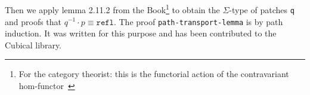 \begin{code}
\AgdaSymbol{)}\AgdaSpace{}%
\AgdaSpace{}%
\AgdaSymbol{))}\<%
\\
\>[2][@{}l@{\AgdaIndent{0}}]%
\>[4]\AgdaSpace{}%
\AgdaSpace{}%
\AgdaSpace{}%
\AgdaSpace{}%
\AgdaSpace{}%
\AgdaSpace{}%
\AgdaSpace{}%
\AgdaSpace{}%
\AgdaSpace{}%
\AgdaSpace{}%
\AgdaSpace{}%
\AgdaSpace{}%
\AgdaSymbol{)}\AgdaSpace{}%
\AgdaSpace{}%
\AgdaSymbol{)}\AgdaSpace{}%
\<%
\\
%
\>[2]\AgdaSymbol{(}\AgdaFunction{Σ[}\AgdaSpace{}%
\AgdaSpace{}%
\AgdaSpace{}%
\AgdaSpace{}%
\AgdaFunction{]}\AgdaSpace{}%
\AgdaSymbol{(}\AgdaSpace{}%
\AgdaSpace{}%
\AgdaSpace{}%
\AgdaSpace{}%
\AgdaSpace{}%
\AgdaSpace{}%
\AgdaSpace{}%
\AgdaSymbol{)}\AgdaSpace{}%
\AgdaSymbol{)}\AgdaSpace{}%
\AgdaSpace{}%
\AgdaSymbol{)}\<%
\end{code}
Then we apply lemma 2.11.2 from the Book\footnote{For the category theorist: this is the functorial action of the contravariant hom-functor~\cite{hottbook}}
to obtain the $\Sigma$-type of patches \texttt{q} and proofs that $q^{-1} \cdot p \equiv \texttt{refl}$.
The proof \texttt{path-transport-lemma} is by path induction.
It was written for this purpose and has been contributed to the Cubical library.
\begin{code}[hide]%
\>[2][@{}l@{\AgdaIndent{1}}]%
\>[4]\AgdaSpace{}%
\AgdaSpace{}%
\<%
\end{code}

